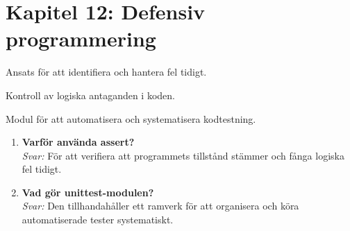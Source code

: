 \documentclass[11pt,a4paper]{article}
\begin{document}
\section{Kapitel 12: Defensiv programmering}

\begin{description}[style=nextline, leftmargin=1cm, labelindent=0.5cm]
    \item[\color{primary}Defensiv programmering] Ansats för att identifiera och hantera fel tidigt.
    \item[\color{primary}Assert] Kontroll av logiska antaganden i koden.
    \item[\color{primary}unittest] Modul för att automatisera och systematisera kodtestning.
\end{description}

\begin{enumerate}[label=\bfseries\color{primary}Fråga \arabic*:, leftmargin=1.8cm]
    \item \textbf{Varför använda assert?}
    \\ \textit{Svar:} För att verifiera att programmets tillstånd stämmer och fånga logiska fel tidigt.
    
    \item \textbf{Vad gör unittest-modulen?}
    \\ \textit{Svar:} Den tillhandahåller ett ramverk för att organisera och köra automatiserade tester systematiskt.
\end{enumerate}
\end{document}
